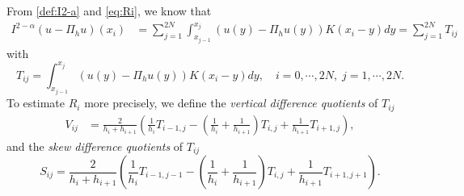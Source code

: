 \documentclass{amsart}
\theoremstyle{definition}
\newtheorem{definition}[theorem]{Definition}
\theoremstyle{remark}
\numberwithin{equation}{section}
\begin{document}
From \eqref{def:I2-a} and \eqref{eq:Ri}, we know that
\begin{equation} \label{eq:I2-au-Piu}
\begin{aligned}
    I^{2-\alpha} \left( u-\Pi_hu \right) (x_i)
     &= \sum_{j=1}^{2N} \int_{x_{j-1}}^{x_{j}} (u(y) - \Pi_hu(y)) K(x_i-y) dy
     = \sum_{j=1}^{2N} T_{ij}
\end{aligned}
\end{equation}
with
  \begin{equation} \label{def:Tij}
    T_{ij} = \int_{x_{j-1}}^{x_{j}} (u(y) - \Pi_hu(y)) K(x_i-y) dy, \quad i=0, \cdots ,2N,\; j=1, \cdots , 2N.
  \end{equation}
  To estimate $R_i$ more precisely, we define the {\em vertical difference quotients} of \(T_{ij}\)
  \begin{equation} \label{def:Vij}
    \begin{aligned}
      V_{ij} &=  \frac{2}{h_{i} + h_{i+1}}  \left( \frac{1}{h_{i}}  T_{i-1,j} - \left(\frac{1}{h_{i}} + \frac{1}{h_{i+1}}\right)  T_{i,j} + \frac{1}{h_{i+1}} T_{i+1,j} \right)  ,
    \end{aligned}
  \end{equation}
  and the {\em skew difference quotients} of \(T_{ij}\)
  \begin{equation} \label{def:Sij}
    S_{ij} =  \frac{2}{h_{i} + h_{i+1}}  \left( \frac{1}{h_{i}}  T_{i-1,j-1} - \left(\frac{1}{h_{i}} + \frac{1}{h_{i+1}}\right)  T_{i,j} + \frac{1}{h_{i+1}} T_{i+1,j+1} \right).
  \end{equation}
\end{document}
